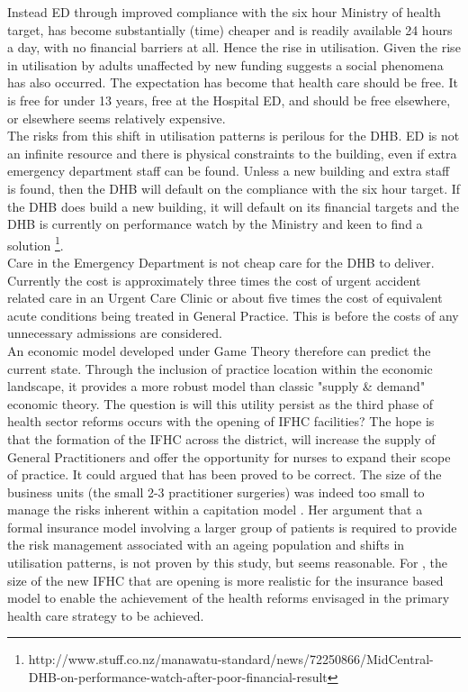 \documentclass[11pt,a4paper]{article}
\begin{document}
Instead ED through improved compliance with the six hour Ministry of health target, has become substantially (time) cheaper and is readily available 24 hours a day, with no financial barriers at all. Hence the rise in utilisation. Given the rise in utilisation by adults unaffected by new funding suggests a social phenomena has also occurred. The expectation has become that health care should be free. It is free for under 13 years, free at the Hospital ED, and should be free elsewhere, or elsewhere seems relatively expensive. \\

The risks from this shift in utilisation patterns is perilous for the DHB. ED is not an infinite resource and there is physical constraints to the building, even if extra emergency department staff can be found. Unless a new building and extra staff is found, then the DHB will default on the compliance with the six hour target. If the DHB does build a new building, it will default on its financial targets and the DHB is currently on performance watch by the Ministry and keen to find a solution \footnote{http://www.stuff.co.nz/manawatu-standard/news/72250866/MidCentral-DHB-on-performance-watch-after-poor-financial-result}. \\

Care in the Emergency Department is not cheap care for the DHB to deliver. Currently the cost is approximately three times the cost of urgent accident related care in an Urgent Care Clinic or about five times the cost of equivalent acute conditions being treated in General Practice. This is before the costs of any unnecessary admissions are considered.\\

An economic model developed under Game Theory therefore can predict the current state. Through the inclusion of practice location within the economic landscape, it provides a more robust model than classic "supply \& demand" economic theory. The question is will this utility persist as the third phase of health sector reforms occurs with the opening of IFHC facilities? The hope is that the formation of the IFHC across the district, will increase the supply of General Practitioners and offer the opportunity for nurses to expand their scope of practice. It could argued that\citet{howell2005restructuring} has been proved to be correct. The size of the business units (the small 2-3 practitioner surgeries) was indeed too small to manage the risks inherent within a capitation model \citep{howell2005restructuring}. Her argument that a formal insurance model involving a larger group of patients is required to provide the risk management associated with an ageing population and shifts in utilisation patterns, is not proven by this study, but seems reasonable. For \citet{howell2005restructuring}, the size of the new IFHC that are opening is more realistic for the insurance based model to enable the achievement of the health reforms envisaged in the primary health care strategy to be achieved.\\
\end{document}
